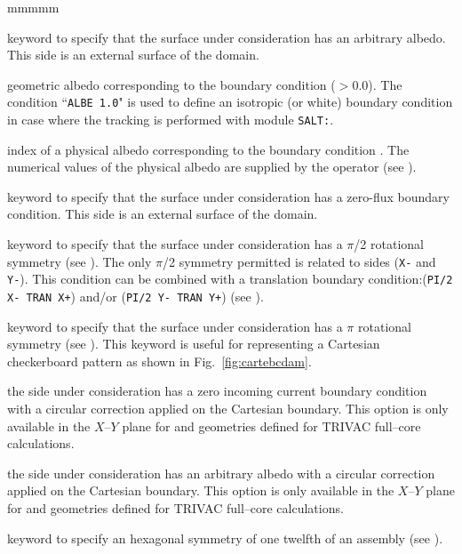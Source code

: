 \begin{ListeDeDescription}{mmmmm}
\item[\moc{ALBE}] keyword to specify that the surface under consideration has
an arbitrary albedo. This side is an external surface of the domain.

\item[\dusa{albedo}] geometric albedo corresponding to the boundary condition
 ($>$0.0). The condition ``{\tt ALBE 1.0}" is used to define an isotropic (or white)
boundary condition in case where the tracking is performed with module {\tt SALT:}.

\item[\dusa{icode}] index of a physical albedo corresponding to the boundary
condition . The numerical values of the physical albedo are supplied
by the operator  (see ).

\item[\moc{ZERO}] keyword to specify that the surface under consideration has a
zero-flux boundary condition. This side is an external surface of the domain.

\item[\moc{PI/2}] keyword to specify that the surface under consideration has a
$\pi$/2 rotational symmetry (see ). The only $\pi$/2 symmetry permitted is related to
sides ({\tt X-} and {\tt Y-}). This condition can be combined with a translation
boundary condition:({\tt PI/2 X- TRAN X+}) and/or ({\tt PI/2 Y- TRAN Y+}) (see ).

\item[\moc{PI}] keyword to specify that the surface under consideration has a
$\pi$ rotational symmetry (see ). This keyword is useful for representing a
Cartesian checkerboard pattern as shown in Fig.~\ref{fig:cartebcdam}.

\item[\moc{CYLI}] the side under consideration has a zero incoming current boundary condition
with a circular correction applied on the Cartesian boundary. This option is only available in
the $X$--$Y$ plane for  and  geometries defined for TRIVAC full--core calculations.

\item[\moc{ACYL}] the side under consideration has an arbitrary albedo with a circular correction
applied on the Cartesian boundary. This option is only available in
the $X$--$Y$ plane for  and  geometries defined for TRIVAC full--core calculations.

\item[\moc{S30}] keyword to specify an hexagonal symmetry of one twelfth of an
assembly (see ).


\end{ListeDeDescription}

